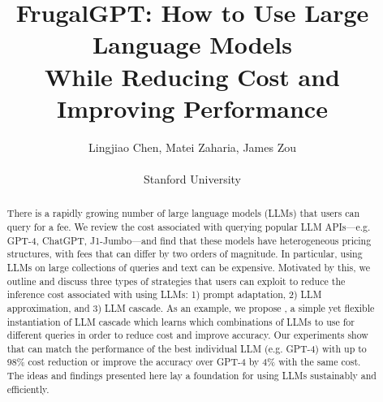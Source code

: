 \documentclass{article}
\title{FrugalGPT: How to Use Large Language Models  \\While Reducing Cost and Improving Performance}
\author{Lingjiao Chen, Matei Zaharia, James Zou\\\\
Stanford University}
\date{}
\begin{document}
\maketitle

\begin{abstract}
There is a rapidly growing number of large language models (LLMs) that users can query for a fee. We review the cost associated with querying popular LLM APIs---e.g. GPT-4, ChatGPT, J1-Jumbo---and find that these models have heterogeneous pricing structures, with fees that can differ by two orders of magnitude. In particular, using LLMs on large collections of queries and text can be expensive. Motivated by this, we outline and discuss  three types of strategies that users can exploit to reduce the inference cost associated with using LLMs: 1) prompt adaptation, 2) LLM approximation, and 3) LLM cascade. As an example, we propose \systemFGPT{}, a simple yet flexible instantiation of LLM cascade which learns which combinations of LLMs to use for different queries in order to reduce cost and improve accuracy. Our experiments show that \systemFGPT{} can match the performance of the best individual LLM (e.g. GPT-4) with up to 98\% cost reduction or improve the accuracy over GPT-4 by 4\% with the same cost. The ideas and findings presented here lay a foundation for using LLMs sustainably and efficiently.     

\end{abstract}
\end{document}
